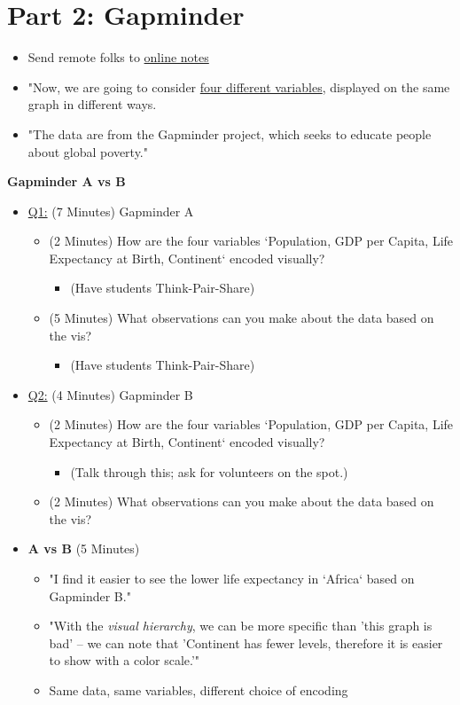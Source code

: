 \documentclass[11pt]{article}
\begin{document}
\section{Part 2: Gapminder}
\label{sec:org4fc256a}
\begin{itemize}
\item Send remote folks to \href{https://citrineinformatics.github.io/ga-tech-workshop/04-vis-principles/index.html}{online notes}
\item "Now, we are going to consider \uline{four different variables}, displayed on the
same graph in different ways.
\item "The data are from the Gapminder project, which seeks to educate people about
global poverty."
\end{itemize}

\textbf{Gapminder A vs B}
\begin{itemize}
\item \uline{Q1:} (7 Minutes) Gapminder A
\begin{itemize}
\item (2 Minutes) How are the four variables `Population, GDP per Capita, Life Expectancy at
Birth, Continent` encoded visually?
\begin{itemize}
\item (Have students Think-Pair-Share)
\end{itemize}
\item (5 Minutes) What observations can you make about the data based on the vis?
\begin{itemize}
\item (Have students Think-Pair-Share)
\end{itemize}
\end{itemize}

\item \uline{Q2:} (4 Minutes) Gapminder B
\begin{itemize}
\item (2 Minutes) How are the four variables `Population, GDP per Capita, Life Expectancy at
Birth, Continent` encoded visually?
\begin{itemize}
\item (Talk through this; ask for volunteers on the spot.)
\end{itemize}
\item (2 Minutes) What observations can you make about the data based on the vis?
\end{itemize}

\item \textbf{A vs B} (5 Minutes)
\begin{itemize}
\item "I find it easier to see the lower life expectancy in `Africa` based on Gapminder B."
\item "With the \emph{visual hierarchy}, we can be more specific than 'this graph is
bad' -- we can note that 'Continent has fewer levels, therefore it is easier
to show with a color scale.'"
\item Same data, same variables, different choice of encoding
\end{itemize}
\end{itemize}
\end{document}
